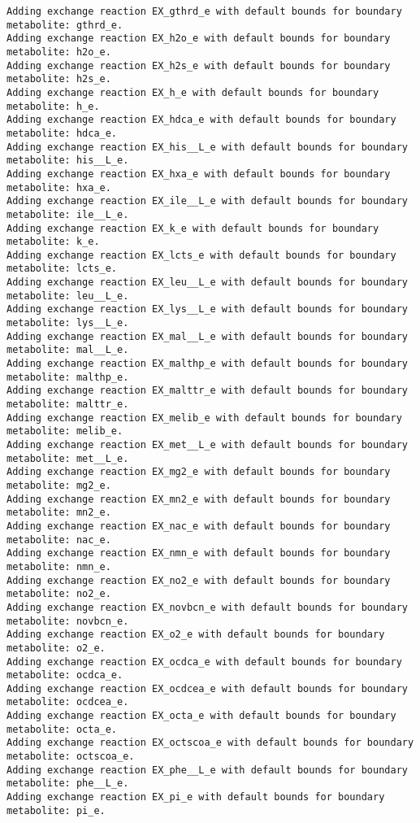 \documentclass[
  letterpaper,
  DIV=11,
  numbers=noendperiod]{scrartcl}
\begin{document}
\begin{verbatim}
Adding exchange reaction EX_gthrd_e with default bounds for boundary metabolite: gthrd_e.
Adding exchange reaction EX_h2o_e with default bounds for boundary metabolite: h2o_e.
Adding exchange reaction EX_h2s_e with default bounds for boundary metabolite: h2s_e.
Adding exchange reaction EX_h_e with default bounds for boundary metabolite: h_e.
Adding exchange reaction EX_hdca_e with default bounds for boundary metabolite: hdca_e.
Adding exchange reaction EX_his__L_e with default bounds for boundary metabolite: his__L_e.
Adding exchange reaction EX_hxa_e with default bounds for boundary metabolite: hxa_e.
Adding exchange reaction EX_ile__L_e with default bounds for boundary metabolite: ile__L_e.
Adding exchange reaction EX_k_e with default bounds for boundary metabolite: k_e.
Adding exchange reaction EX_lcts_e with default bounds for boundary metabolite: lcts_e.
Adding exchange reaction EX_leu__L_e with default bounds for boundary metabolite: leu__L_e.
Adding exchange reaction EX_lys__L_e with default bounds for boundary metabolite: lys__L_e.
Adding exchange reaction EX_mal__L_e with default bounds for boundary metabolite: mal__L_e.
Adding exchange reaction EX_malthp_e with default bounds for boundary metabolite: malthp_e.
Adding exchange reaction EX_malttr_e with default bounds for boundary metabolite: malttr_e.
Adding exchange reaction EX_melib_e with default bounds for boundary metabolite: melib_e.
Adding exchange reaction EX_met__L_e with default bounds for boundary metabolite: met__L_e.
Adding exchange reaction EX_mg2_e with default bounds for boundary metabolite: mg2_e.
Adding exchange reaction EX_mn2_e with default bounds for boundary metabolite: mn2_e.
Adding exchange reaction EX_nac_e with default bounds for boundary metabolite: nac_e.
Adding exchange reaction EX_nmn_e with default bounds for boundary metabolite: nmn_e.
Adding exchange reaction EX_no2_e with default bounds for boundary metabolite: no2_e.
Adding exchange reaction EX_novbcn_e with default bounds for boundary metabolite: novbcn_e.
Adding exchange reaction EX_o2_e with default bounds for boundary metabolite: o2_e.
Adding exchange reaction EX_ocdca_e with default bounds for boundary metabolite: ocdca_e.
Adding exchange reaction EX_ocdcea_e with default bounds for boundary metabolite: ocdcea_e.
Adding exchange reaction EX_octa_e with default bounds for boundary metabolite: octa_e.
Adding exchange reaction EX_octscoa_e with default bounds for boundary metabolite: octscoa_e.
Adding exchange reaction EX_phe__L_e with default bounds for boundary metabolite: phe__L_e.
Adding exchange reaction EX_pi_e with default bounds for boundary metabolite: pi_e.

\end{verbatim}
\end{document}
